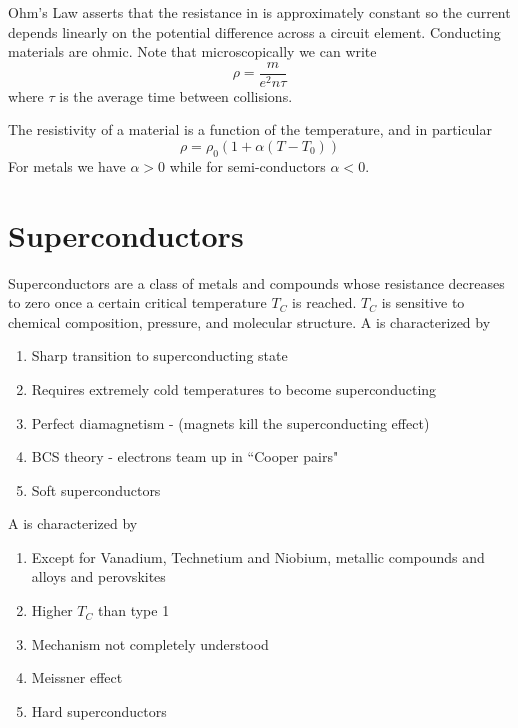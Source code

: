\documentclass[12pt]{report}
\begin{document}
\begin{thm}{Ohm's Law}{}
         asserts that the resistance in  is approximately constant so the current depends linearly on the potential difference across a circuit element. Conducting materials are ohmic. Note that microscopically we can write \begin{equation}
                \rho = \frac{m}{e^2n\tau}
        \end{equation}
        where $\tau$ is the average time between collisions.
\end{thm}

\begin{rmk}{}{}
        The resistivity of a material is a function of the temperature, and in particular \begin{equation}
                \rho = \rho_0(1+\alpha(T - T_0))
        \end{equation}
        For metals we have $\alpha > 0$ while for semi-conductors $\alpha < 0$.
\end{rmk}


\section{Superconductors}

\begin{defn}{Superconductors}{}
         are a class of metals and compounds whose resistance decreases to zero once a certain critical temperature $T_C$ is reached. $T_C$ is sensitive to chemical composition, pressure, and molecular structure. A  is characterized by \begin{enumerate}
                \item Sharp transition to superconducting state
                \item Requires extremely cold temperatures to become superconducting
                \item Perfect diamagnetism - (magnets kill the superconducting effect)
                \item BCS theory - electrons team up in ``Cooper pairs"
                \item Soft superconductors
        \end{enumerate}
        A  is characterized by \begin{enumerate}
                \item Except for Vanadium, Technetium and Niobium, metallic compounds and alloys and perovskites
                \item Higher $T_C$ than type 1
                \item Mechanism not completely understood
                \item Meissner effect
                \item Hard superconductors
        \end{enumerate}
\end{defn}
\end{document}
